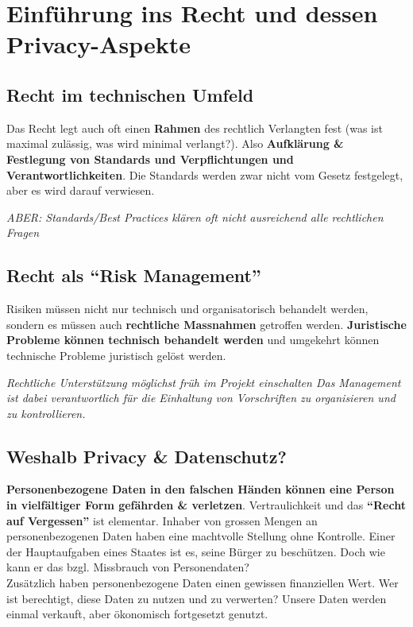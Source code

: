 \section{Einführung ins Recht und dessen Privacy-Aspekte}

\subsection{Recht im technischen Umfeld}

Das Recht legt auch oft einen \textbf{Rahmen} des rechtlich Verlangten
fest (was ist maximal zulässig, was wird minimal verlangt?). Also
\textbf{Aufklärung \& Festlegung von Standards und Verpflichtungen und
Verantwortlichkeiten}. Die Standards werden zwar nicht vom Gesetz
festgelegt, aber es wird darauf verwiesen.

\emph{ABER: Standards/Best Practices klären oft nicht ausreichend alle
rechtlichen Fragen}

\subsection{Recht als ``Risk Management''}

Risiken müssen nicht nur technisch und organisatorisch behandelt werden,
sondern es müssen auch \textbf{rechtliche Massnahmen} getroffen werden.
\textbf{Juristische Probleme können technisch behandelt werden} und
umgekehrt können technische Probleme juristisch gelöst werden.

\emph{Rechtliche Unterstützung möglichst früh im Projekt einschalten
Das Management ist dabei verantwortlich für die Einhaltung von Vorschriften
zu organisieren und zu kontrollieren.}

\subsection{Weshalb Privacy \& Datenschutz?}

\textbf{Personenbezogene Daten in den falschen Händen können eine Person
in vielfältiger Form gefährden \& verletzen}. Vertraulichkeit und das
\textbf{``Recht auf Vergessen''} ist elementar. Inhaber von grossen
Mengen an personenbezogenen Daten haben eine machtvolle Stellung ohne
Kontrolle. Einer der Hauptaufgaben eines Staates ist es, seine Bürger zu
beschützen. Doch wie kann er das bzgl. Missbrauch von Personendaten?\\
Zusätzlich haben personenbezogene Daten einen gewissen finanziellen Wert.
Wer ist berechtigt, diese Daten zu nutzen und zu verwerten?
Unsere Daten werden einmal verkauft, aber ökonomisch fortgesetzt genutzt.

